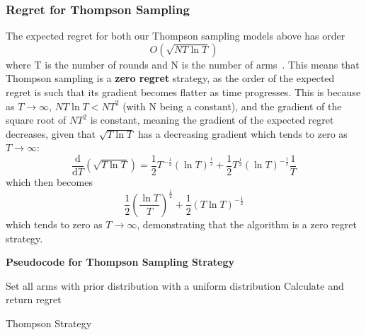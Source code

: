 \subsubsection{Regret for Thompson Sampling}
The expected regret for both our Thompson sampling models above has order
\[O\left(\sqrt{NT\ln{T}}\right)\]
where T is the number of rounds and N is the number of arms~\citep{agrawal2013further}.
This means that Thompson sampling is a \textbf{zero regret} strategy, as the order of the expected regret is such that its gradient becomes flatter as time progresses.
This is because as $T\to\infty$, $NT\ln{T} < NT^2$ (with N being a constant), and the gradient of the square root of $NT^2$ is constant, meaning the gradient of the expected regret decreases, given that $\sqrt{T\ln{T}}$ has a decreasing gradient which tends to zero as $T\to\infty$:
\newline
\[\frac{\mathrm{d} }{\mathrm{d} T} (\sqrt{T \ln{T}}) = \frac{1}{2}T^{-\frac{1}{2}}(\ln{T})^\frac{1}{2} + \frac{1}{2}T^{\frac{1}{2}}(\ln{T})^{-\frac{1}{2}}\frac{1}{T}\]
which then becomes
\newline
\[ \frac{1}{2}\left(\frac{\ln{T}}{T}\right)^\frac{1}{2} + \frac{1}{2}(T\ln{T})^{-\frac{1}{2}} \]
\newline
which tends to zero as $T\to\infty$, demonstrating that the algorithm is a zero regret strategy.


\textbf{Pseudocode for Thompson Sampling Strategy}
\newline
\begin{algorithm}[H]
    Set all arms with prior distribution with a uniform distribution\;
        Calculate and return regret
        \caption{Thompson Strategy}\label{alg:thompson_algorithm}
    \end{algorithm}